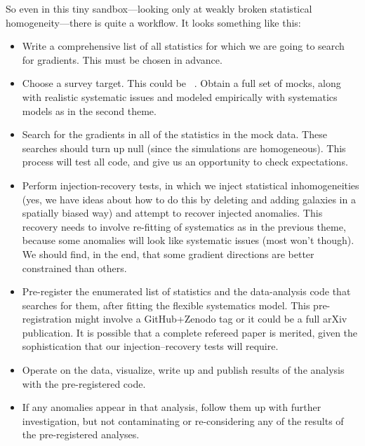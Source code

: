 \documentclass[12pt, fullpage, letterpaper]{article}
\begin{document}
So even in this tiny sandbox---looking only at weakly broken
statistical homogeneity---there is quite a workflow. It looks
something like this:
\begin{itemize}
\item
Write a comprehensive list of all statistics for which we are going to search
for gradients. This must be chosen in advance.
\item
Choose a survey target. This could be
\SDSSIV\ . Obtain a full set of mocks, along
with realistic systematic issues and modeled empirically with
systematics models as in the second theme.
\item
Search for the gradients in all of the statistics in the mock
data. These searches should turn up null (since the simulations are
homogeneous). This process will test all code, and give us an
opportunity to check expectations.
\item
Perform injection-recovery tests, in which we inject statistical inhomogeneities
(yes, we have ideas about how to do this by deleting and adding galaxies in a
spatially biased way) and attempt to recover injected anomalies.
This recovery needs to involve re-fitting of systematics as in the previous
theme, because some anomalies will look like systematic issues (most won't though).
We should find, in the end, that some gradient directions are better constrained than others.
\item
Pre-register the enumerated list of statistics and the data-analysis code that
searches for them, after fitting the flexible systematics model.
This pre-registration might involve a GitHub+Zenodo tag or it could be
a full arXiv publication. It is possible that a complete refereed paper
is merited, given the sophistication that our injection--recovery tests will require.
\item
Operate on the data, visualize, write up and publish results of the
analysis with the pre-registered code.
\item
If any anomalies appear in that analysis, follow them up with further
investigation, but not contaminating or re-considering any of the results
of the pre-registered analyses.
\end{itemize}
\end{document}
